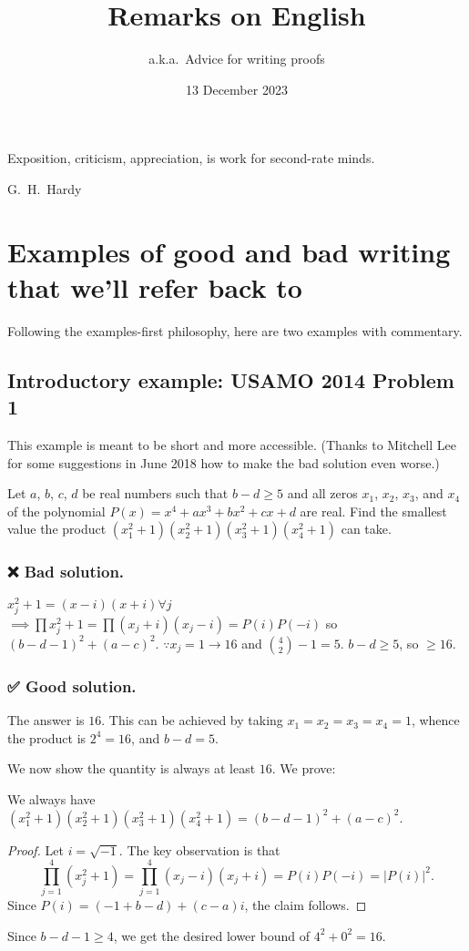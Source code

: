 \documentclass[11pt]{scrartcl}
\begin{document}
\title{Remarks on English}
\subtitle{a.k.a.\ Advice for writing proofs}
\date{13 December 2023}
\maketitle

\epigraph{Exposition, criticism, appreciation, is work for second-rate minds.}
{G.\ H.\ Hardy}

\tableofcontents
\newpage

\section{Examples of good and bad writing that we'll refer back to}
\label{sec:examples}
Following the examples-first philosophy, here are two examples with commentary.

\subsection{Introductory example: USAMO 2014 Problem 1}
This example is meant to be short and more accessible.
(Thanks to Mitchell Lee for some suggestions in June 2018 how to make the
bad solution even worse.)

\begin{example}
  [USAMO 2014/1]
  Let $a$, $b$, $c$, $d$ be real numbers such that $b-d \ge 5$ and all zeros
  $x_1$, $x_2$, $x_3$, and $x_4$ of the polynomial $P(x)=x^4+ax^3+bx^2+cx+d$ are real.
  Find the smallest value the product $(x_1^2+1)(x_2^2+1)(x_3^2+1)(x_4^2+1)$ can take.
\end{example}

\subsubsection*{❌ Bad solution.}
$x_j^2+1 = (x-i)(x+i) \forall j$
$\implies \prod x_j^2+1 = \prod (x_j+i)(x_j-i) = P(i)P(-i)$
so $(b-d-1)^2 + (a-c)^2$.
$\because x_j = 1 \rightarrow 16$ and $\binom42-1 = 5$.
$b-d \ge 5$, so $\ge 16$.

\subsubsection*{✅ Good solution.}
The answer is $\boxed{16}$.
This can be achieved by taking $x_1 = x_2 = x_3 = x_4 = 1$,
whence the product is $2^4 = 16$, and $b-d = 5$.

We now show the quantity is always at least $16$.
We prove:
\begin{claim*}
  We always have $(x_1^2+1)(x_2^2+1)(x_3^2+1)(x_4^2+1) = (b-d-1)^2 + (a-c)^2$.
\end{claim*}
\begin{proof}
  Let $i = \sqrt{-1}$.
  The key observation is that
  \[ \prod_{j=1}^4 \left( x_j^2 + 1 \right)
    = \prod_{j=1}^4 (x_j - i)(x_j + i)
    = P(i)P(-i) = |P(i)|^2. \]
  Since $P(i) = (-1+b-d) + (c-a)i$, the claim follows.
\end{proof}
Since $b-d-1 \ge 4$, we get the desired lower bound of $4^2+0^2=16$.
\end{document}
